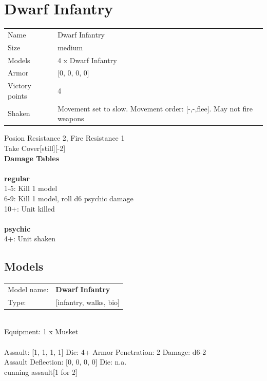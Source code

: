 \clearpage

\section{ Dwarf Infantry }

\begin{tabular}{ll}
  Name & Dwarf Infantry \\
  Size & medium\\
  Models & 4 x Dwarf Infantry\\
  Armor & [0, 0, 0, 0]\\
  Victory points & 4\\
  Shaken & Movement set to slow. Movement order: [-,-,flee]. May not fire weapons\\
\end{tabular}

Posion Resistance 2, Fire Resistance 1\\ 
Take Cover[still][-2]\\ 



{\bf Damage Tables} \\
\ \\ {\bf regular } \\
1-5: Kill 1 model \\
6-9: Kill 1 model, roll d6 psychic damage \\
10+: Unit killed \\
\ \\ {\bf psychic } \\
4+: Unit shaken \\


\clearpage

\subsection{ Models }

\begin{tabular}{ll}
Model name: & {\bf Dwarf Infantry } \\
Type: & [infantry, walks, bio] \\
\end{tabular}
\ \\
Equipment: 1 x Musket \\
\ \\
Assault: [1, 1, 1, 1] Die: 4+ Armor Penetration: 2 Damage: d6-2 \\
Assault Deflection: [0, 0, 0, 0] Die: n.a.\\
\indent cunning assault[1 for 2]\\ 
 
